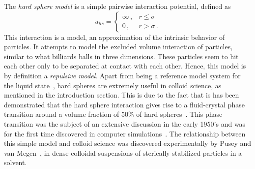 The \emph{hard sphere model} is a simple pairwise interaction potential, defined as
\begin{equation}
    u_{hs} = 
    \begin{cases}
        \infty \, , &r \leq \sigma \\
        0 \, , &r > \sigma \, .
    \end{cases}
    \label{eq:hard-sphere}
\end{equation}
This interaction is a model, an approximation of the intrinsic behavior of particles.
It attempts to model the excluded volume interaction of particles, similar to what
billiards balls in three dimensions. These particles seem to hit each other only to
be separated at contact with each other. Hence, this model is by definition a
\emph{repulsive model}.
Apart from being a reference model system for the liquid
state~\cite{hansenTheorySimpleLiquids2013}, hard spheres are extremely useful in
colloid science, as mentioned in the introduction section. This is due to the fact
that is has been demonstrated that the hard sphere interaction gives rise to a
fluid-crystal phase transition around a volume fraction of 50\% of hard 
spheres~\cite{hooverMeltingTransitionCommunal1968a,gastSimpleOrderingComplex1998,roblesNoteEquationState2014a}.
This phase transition was the subject of an extensive discussion in the early
1950's and was for the first time discovered in computer
simulations~\cite{alderPhaseTransitionHard1957a}.
The relationship between this simple model and colloid science was discovered
experimentally by Pusey and van Megen~\cite{puseyPhaseBehaviourConcentrated1986},
in dense colloidal suspensions of sterically stabilized particles in a solvent.

